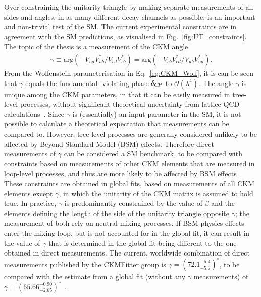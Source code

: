 Over-constraining the unitarity triangle by making separate measurements of all sides and angles, in as many different decay channels as possible, is an important and non-trivial test of the SM. The current experimental constraints are in agreement with the SM predictions, as visualised in Fig.~\ref{fig:UT_constraints}. 
The topic of the thesis is a measurement of the CKM angle
\begin{align}\label{eq:gamma_definition}
    \gamma \equiv \mathrm{arg} (-V_{ud}^{\phantom{*}}V_{ub}^*/V_{cd}^{\phantom{*}}V_{cb}^*)
    = \mathrm{arg} (-V_{cb}^{\phantom{*}}V_{cd}^*/V_{ub}^{\phantom{*}}V_{ud}^*).
\end{align}
From the Wolfenstein parameterisation in Eq.~\eqref{eq:CKM_Wolf}, it is can be seen that $\gamma$ equals the fundamental \CP-violating phase $\delta_{C\!P}$ to $\mathcal O(\lambda^4)$. The angle $\gamma$ is unique among the CKM parameters, in that it can be easily measured in tree-level processes, without significant theoretical uncertainty from lattice QCD calculations~\cite{brodUltimateTheoreticalError2014}. Since $\gamma$ is (essentially) an input parameter in the SM, it is not possible to calculate a theoretical expectation that measurements can be compared to. However, tree-level processes are generally considered unlikely to be affected by Beyond-Standard-Model (BSM) effects. Therefore direct measurements of $\gamma$ can be considered a SM benchmark, to be compared with constraints based on measurements of other CKM elements that are measured in loop-level processes, and thus are more likely to be affected by BSM effects~\cite{blankeEmergingDeltaAnomaly2019}. These constraints are obtained in global fits, based on measurements of all CKM elements except $\gamma$, in which the unitarity of the CKM matrix is assumed to hold true. In practice, $\gamma$ is predominantly constrained by the value of $\beta$ and the elements defining the length of the side of the unitarity triangle opposite $\gamma$; the measurement of both rely on neutral \B mixing processes. If BSM physics effects enter the mixing loop, but is not accounted for in the global fit, it can result in the value of $\gamma$ that is determined in the global fit being different to the one obtained in direct measurements.
The current, worldwide combination of direct measurements published by the CKMFitter group is $\gamma = (72.1^{+5.4}_{-5.7})^\circ $, to be compared with the estimate from a global fit (without any $\gamma$ measurements) of $\gamma = (65.66^{+0.90}_{-2.65})^\circ $~\cite{CKMfitter2015}. 
